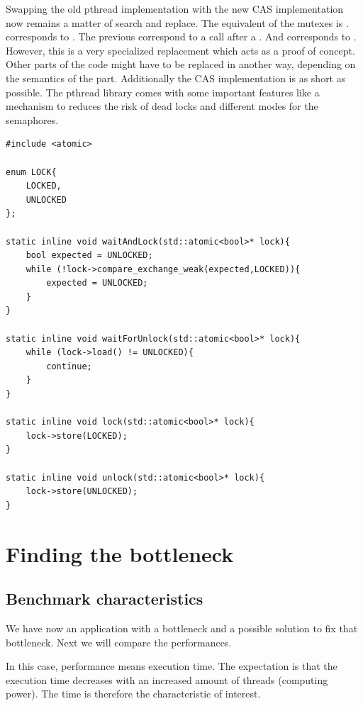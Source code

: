 Swapping the old pthread implementation with the new CAS implementation now remains a matter of search and replace. The equivalent of the mutexes  is .  corresponds to . The previous  correspond to a  call after a . And  corresponds to .\\
However, this is a very specialized replacement which acts as a proof of concept. Other parts of the code might have to be replaced in another way, depending on the semantics of the part. Additionally the CAS implementation is as short as possible. The pthread library comes with some important features like a mechanism to reduces the risk of dead locks and different modes for the semaphores.

\begin{lstlisting}
#include <atomic>

enum LOCK{
    LOCKED,
    UNLOCKED
};

static inline void waitAndLock(std::atomic<bool>* lock){
    bool expected = UNLOCKED;
    while (!lock->compare_exchange_weak(expected,LOCKED)){
        expected = UNLOCKED;
    }
}

static inline void waitForUnlock(std::atomic<bool>* lock){
    while (lock->load() != UNLOCKED){
        continue;
    }
}

static inline void lock(std::atomic<bool>* lock){
    lock->store(LOCKED);
}

static inline void unlock(std::atomic<bool>* lock){
    lock->store(UNLOCKED);
}
\end{lstlisting}

\section{Finding the bottleneck}
\subsection{Benchmark characteristics}
We have now an application with a bottleneck and a possible solution to fix that bottleneck. Next we will compare the performances.

In this case, performance means execution time. The expectation is that the execution time decreases with an increased amount of threads (computing power). The time is therefore the characteristic of interest.

